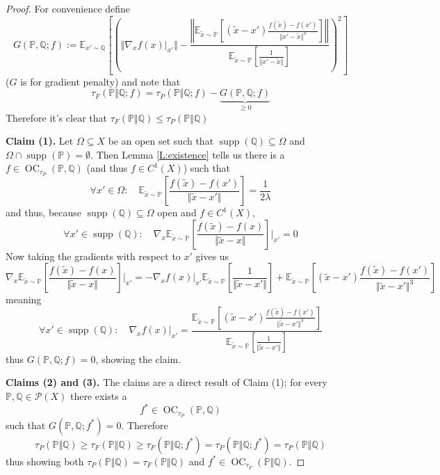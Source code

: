 \documentclass{article}
\DeclareMathOperator{\supp}{supp}
\DeclareMathOperator{\oc}{OC}
\begin{document}
\begin{proof}
For convenience define
\[G(\mathbb P,\mathbb Q;f):=\mathbb E_{x'\sim\mathbb Q}\left[\left(\Vert\nabla_x f(x)\big|_{x'}\Vert-
  \frac{\left\Vert\mathbb E_{\tilde x\sim\mathbb P}[(\tilde x- x')\frac{f(\tilde x)-f(x')}{\Vert x'-\tilde x\Vert^3}]\right\Vert}
 {\mathbb E_{\tilde x\sim\mathbb P}[\frac{1}{\Vert x'-\tilde x\Vert}]}
  \right)^2\right]\]
($G$ is for gradient penalty) and note that
\[\tau_F(\mathbb P\Vert\mathbb Q;f)=\tau_P(\mathbb P\Vert\mathbb Q;f)-\underbrace{G(\mathbb P,\mathbb Q;f)}_{\geq 0}\]
Therefore it's clear that $\tau_F(\mathbb P\Vert\mathbb Q)\leq\tau_P(\mathbb P\Vert\mathbb Q)$

\noindent\textbf{Claim (1). }
Let $\Omega\subseteq X$ be an open set such that $\supp(\mathbb Q)\subseteq\Omega$ and $\Omega\cap\supp(\mathbb P)=\emptyset$.
Then Lemma \ref{L:existence} tells us there is a $f\in\oc_{\tau_P}(\mathbb P,\mathbb Q)$ (and thus $f\in C^1(X)$) such that
\[\forall x'\in\Omega:\quad\mathbb E_{\tilde x\sim\mathbb P}\left[\frac{f(\tilde x)-f(x')}{\Vert \tilde x-x'\Vert}\right]=\frac{1}{2\lambda}\]
and thus, because $\supp(\mathbb Q)\subseteq\Omega$ open and $f\in C^1(X)$,
\[\forall x'\in\supp(\mathbb Q):\quad\nabla_x\mathbb E_{\tilde x\sim\mathbb P}\left[\frac{f(\tilde x)-f(x)}{\Vert \tilde x-x\Vert}\right]\bigg|_{x'}=0\]
Now taking the gradients with respect to $x'$ gives us
\begin{equation}\label{E:long_equation}
\nabla_x\mathbb E_{\tilde x\sim\mathbb P}\left[\frac{f(\tilde x)-f(x)}{\Vert \tilde x-x\Vert}\right]\bigg|_{x'}
=-\nabla_x f(x)|_{x'}\mathbb E_{\tilde x\sim\mathbb P}\left[\frac{1}{\Vert \tilde x-x'\Vert}\right]
+\mathbb E_{\tilde x\sim\mathbb P}\left[(\tilde x-x')\frac{f(\tilde x)-f(x')}{\Vert \tilde x-x'\Vert^3}\right] 
\end{equation}
meaning
\begin{equation}\label{E:g_zero}
\forall x'\in\supp(\mathbb Q):\quad\nabla_x f(x)|_{x'}=\frac{
\mathbb E_{\tilde x\sim\mathbb P}\left[(\tilde x-x')\frac{f(\tilde x)-f(x')}{\Vert \tilde x-x'\Vert^3}\right]
}{
\mathbb E_{\tilde x\sim\mathbb P}\left[\frac{1}{\Vert \tilde x-x'\Vert}\right]
}
\end{equation}
thus $G(\mathbb P,\mathbb Q;f)=0$, showing the claim.

\noindent\textbf{Claims (2) and (3). }
The claims are a direct result of Claim (1);
for every $\mathbb P,\mathbb Q\in\mathcal P(X)$ there exists a
\[f^*\in\oc_{\tau_P}(\mathbb P,\mathbb Q)\]
such that $G(\mathbb P,\mathbb Q;f^*)=0$. Therefore
\[\tau_P(\mathbb P\Vert\mathbb Q)\geq\tau_F(\mathbb P\Vert\mathbb Q)\geq\tau_F(\mathbb P\Vert\mathbb Q;f^*)=\tau_P(\mathbb P\Vert\mathbb Q;f^*)=\tau_P(\mathbb P\Vert\mathbb Q)\]
thus showing both $\tau_P(\mathbb P\Vert\mathbb Q)=\tau_F(\mathbb P\Vert\mathbb Q)$ and $f^*\in\oc_{\tau_F}(\mathbb P\Vert\mathbb Q)$.


\end{proof}
\end{document}
